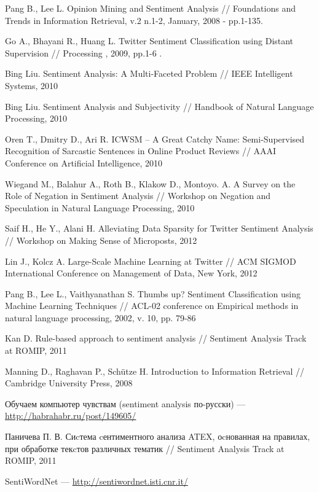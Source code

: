 
Pang B., Lee L. Opinion Mining and Sentiment Analysis // Foundations and 
Trends in Information Retrieval, v.2 n.1-2, January, 2008 - pp.1-135.

Go A., Bhayani R., Huang L. Twitter Sentiment Classification using Distant Supervision // Processing , 2009, pp.1-6 .

Bing Liu. Sentiment Analysis: A Multi-Faceted Problem // IEEE Intelligent Systems, 2010

Bing Liu. Sentiment Analysis and Subjectivity // Handbook of Natural Language Processing, 2010

Oren T., Dmitry D., Ari R. ICWSM – A Great Catchy Name: Semi-Supervised Recognition of Sarcastic Sentences in Online Product Reviews // AAAI Conference on Artificial Intelligence, 2010 

Wiegand M., Balahur A., Roth B., Klakow D., Montoyo. A. A Survey on the Role of Negation in Sentiment Analysis // Workshop on Negation and Speculation in Natural Language Processing, 2010

Saif H., He Y., Alani H. Alleviating Data Sparsity for Twitter Sentiment Analysis // Workshop on Making Sense of Microposts, 2012

Lin J., Kolcz A. Large-Scale Machine Learning at Twitter // ACM SIGMOD International Conference on Management of Data, New York, 2012

Pang B., Lee L., Vaithyanathan S. Thumbs up? Sentiment Classification using Machine Learning Techniques // ACL-02 conference on Empirical methods in natural language processing, 2002, v. 10, pp. 79-86

Kan D. Rule-based approach to sentiment analysis // Sentiment Analysis Track at 
ROMIP, 2011

Manning D., Raghavan P., Schütze H. Introduction to Information Retrieval // Cambridge University Press, 2008

Обучаем компьютер чувствам (sentiment analysis по-русски) --- \url{http://habrahabr.ru/post/149605/}

Паничева П. В. Сиcтема cентиментного анализа ATEX, оcнованная
на правилах, при обработке текcтов различных тематик // Sentiment Analysis Track at ROMIP, 2011

SentiWordNet --- \url{http://sentiwordnet.isti.cnr.it/}

